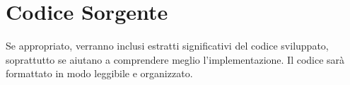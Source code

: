 \chapter{Codice Sorgente}

Se appropriato, verranno inclusi estratti significativi del codice sviluppato, soprattutto se aiutano a comprendere meglio l'implementazione. Il codice sarà formattato in modo leggibile e organizzato.